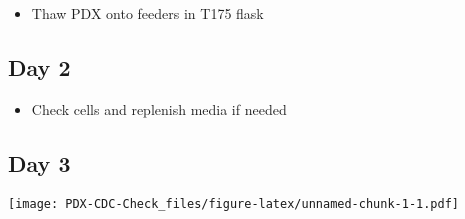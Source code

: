 \documentclass[
]{article}
\providecommand{\tightlist}{%
  \setlength{\itemsep}{0pt}\setlength{\parskip}{0pt}}
\begin{document}
\begin{itemize}
\tightlist
\item
  Thaw PDX onto feeders in T175 flask
\end{itemize}

\hypertarget{day-2}{%
\subsection{Day 2}\label{day-2}}

\begin{itemize}
\tightlist
\item
  Check cells and replenish media if needed
\end{itemize}

\hypertarget{day-3}{%
\subsection{Day 3}\label{day-3}}

\texttt{[image: PDX-CDC-Check\_files/figure-latex/unnamed-chunk-1-1.pdf]}
\end{document}
